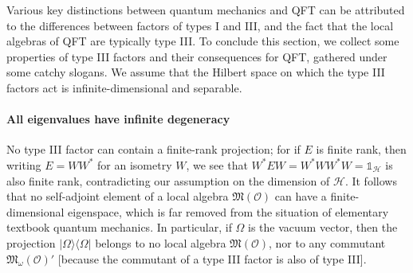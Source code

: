 \documentclass[12pt]{article}
\newcommand{\1}{\mathds{1}}                         %
\newcommand{\Ocal}{\mathcal{O}}
\newcommand{\HH}{{\mathcal{H}}}
\newcommand{\Mf}{{\mathfrak{M}}}
\newcommand{\II}{{\mathbb{1}}}
\newcommand{\ket}[1]{|#1\rangle}
\newcommand{\bra}[1]{\langle #1|}
\begin{document}
Various key distinctions between quantum mechanics and QFT can be attributed to the differences between factors of types I and III, and the fact that the local algebras of QFT are typically type III. To conclude this section, we collect some properties of type III factors and their consequences for QFT, gathered under some catchy slogans. We assume that the Hilbert space on which the type III factors act is infinite-dimensional and separable. 

\paragraph{All eigenvalues have infinite degeneracy}
No type III factor can contain a finite-rank projection; for if $E$ 
is finite rank, then writing $E=WW^*$ for an isometry $W$, we see that 
$W^*EW=W^*WW^*W=\II_\HH$ is also finite rank, contradicting our assumption on the dimension of $\HH$.
It follows that no self-adjoint element of a local algebra $\Mf(\Ocal)$ can have a finite-dimensional eigenspace, which is far removed from the situation of elementary textbook quantum mechanics. In particular, if $\Omega$ is the vacuum vector,
then the projection $\ket{\Omega}\bra{\Omega}$ belongs to no local algebra $\Mf(\Ocal)$, nor to any commutant $\Mf_\omega(\Ocal)'$ [because the commutant of a type III factor is also of type III].
\end{document}
